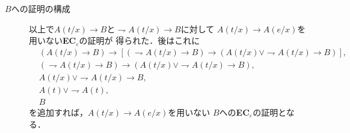 \begin{description}
		\item[$B$への証明の構成]
			以上で$A(t/x) \rightarrow B$と$\rightharpoondown A(t/x) \rightarrow B$に対して
			$A(t/x) \rightarrow A(e/x)$を用いない{\bf EC}${}_{\varepsilon}$の証明が
			得られた．後はこれに
			\begin{align}
				&(A(t/x) \rightarrow B) \rightarrow
				\left[ (\rightharpoondown A(t/x) \rightarrow B) \rightarrow
				(A(t/x) \vee \rightharpoondown A(t/x) \rightarrow B)\right], \\
				&(\rightharpoondown A(t/x) \rightarrow B) \rightarrow
				(A(t/x) \vee \rightharpoondown A(t/x) \rightarrow B), \\
				&A(t/x) \vee \rightharpoondown A(t/x) \rightarrow B, \\
				&A(t) \vee \rightharpoondown A(t), \\
				&B
			\end{align}
			を追加すれば，$A(t/x) \rightarrow A(e/x)$を用いない
			$B$への{\bf EC}${}_{\varepsilon}$の証明となる．
			\QED
	\end{description}	